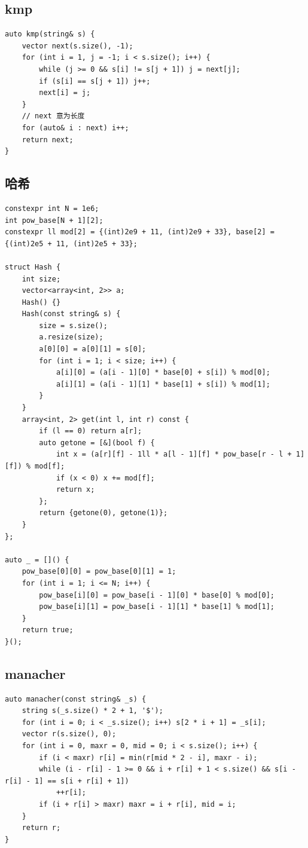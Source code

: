 \documentclass[UTF8, twoside]{ctexart}
\begin{document}
\begin{sloppypar}
\subsection{kmp}

\begin{lstlisting}[style=cpp]
auto kmp(string& s) {
    vector next(s.size(), -1);
    for (int i = 1, j = -1; i < s.size(); i++) {
        while (j >= 0 && s[i] != s[j + 1]) j = next[j];
        if (s[i] == s[j + 1]) j++;
        next[i] = j;
    }
    // next 意为长度
    for (auto& i : next) i++;
    return next;
}
\end{lstlisting}

\subsection{哈希}

\begin{lstlisting}[style=cpp]
constexpr int N = 1e6;
int pow_base[N + 1][2];
constexpr ll mod[2] = {(int)2e9 + 11, (int)2e9 + 33}, base[2] = {(int)2e5 + 11, (int)2e5 + 33};

struct Hash {
    int size;
    vector<array<int, 2>> a;
    Hash() {}
    Hash(const string& s) {
        size = s.size();
        a.resize(size);
        a[0][0] = a[0][1] = s[0];
        for (int i = 1; i < size; i++) {
            a[i][0] = (a[i - 1][0] * base[0] + s[i]) % mod[0];
            a[i][1] = (a[i - 1][1] * base[1] + s[i]) % mod[1];
        }
    }
    array<int, 2> get(int l, int r) const {
        if (l == 0) return a[r];
        auto getone = [&](bool f) {
            int x = (a[r][f] - 1ll * a[l - 1][f] * pow_base[r - l + 1][f]) % mod[f];
            if (x < 0) x += mod[f];
            return x;
        };
        return {getone(0), getone(1)};
    }
};

auto _ = []() {
    pow_base[0][0] = pow_base[0][1] = 1;
    for (int i = 1; i <= N; i++) {
        pow_base[i][0] = pow_base[i - 1][0] * base[0] % mod[0];
        pow_base[i][1] = pow_base[i - 1][1] * base[1] % mod[1];
    }
    return true;
}();
\end{lstlisting}

\subsection{manacher}

\begin{lstlisting}[style=cpp]
auto manacher(const string& _s) {
    string s(_s.size() * 2 + 1, '$');
    for (int i = 0; i < _s.size(); i++) s[2 * i + 1] = _s[i];
    vector r(s.size(), 0);
    for (int i = 0, maxr = 0, mid = 0; i < s.size(); i++) {
        if (i < maxr) r[i] = min(r[mid * 2 - i], maxr - i);
        while (i - r[i] - 1 >= 0 && i + r[i] + 1 < s.size() && s[i - r[i] - 1] == s[i + r[i] + 1])
            ++r[i];
        if (i + r[i] > maxr) maxr = i + r[i], mid = i;
    }
    return r;
}
\end{lstlisting}


\end{sloppypar}
\end{document}
